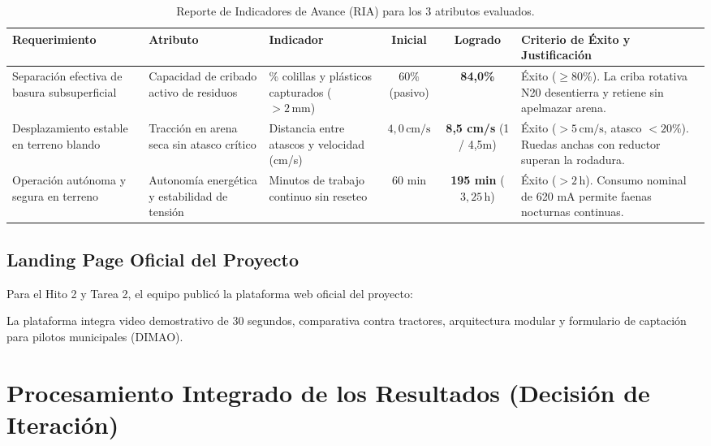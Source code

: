 \documentclass[12pt,letterpaper]{article}
\begin{document}
\begin{table}[h!]
\centering
\footnotesize
{}
\begin{tabularx}{\textwidth}{p{2.5cm} p{2.8cm} p{2.3cm} c c X}
\toprule
\textbf{Requerimiento} & \textbf{Atributo} & \textbf{Indicador} & \textbf{Inicial} & \textbf{Logrado} & \textbf{Criterio de Éxito y Justificación} \\
\midrule
Separación efectiva de basura subsuperficial & Capacidad de cribado activo de residuos & \% colillas y plásticos capturados ($>2\,\text{mm}$) & 60\% (pasivo) & \textbf{84,0\%} & Éxito ($\ge 80\%$). La criba rotativa N20 desentierra y retiene sin apelmazar arena. \\
\addlinespace
Desplazamiento estable en terreno blando & Tracción en arena seca sin atasco crítico & Distancia entre atascos y velocidad (cm/s) & $4,0\,\text{cm/s}$ & \textbf{8,5 cm/s} (1 / 4,5m) & Éxito ($>5\,\text{cm/s}$, atasco $<20\%$). Ruedas anchas con reductor superan la rodadura. \\
\addlinespace
Operación autónoma y segura en terreno & Autonomía energética y estabilidad de tensión & Minutos de trabajo continuo sin reseteo & 60 min & \textbf{195 min} ($3,25\,\text{h}$) & Éxito ($>2\,\text{h}$). Consumo nominal de 620 mA permite faenas nocturnas continuas. \\
\bottomrule
\end{tabularx}
\caption{Reporte de Indicadores de Avance (RIA) para los 3 atributos evaluados.}
\end{table}

\subsection{Landing Page Oficial del Proyecto}
Para el Hito 2 y Tarea 2, el equipo publicó la plataforma web oficial del proyecto:
\begin{center}
\end{center}
La plataforma integra video demostrativo de 30 segundos, comparativa contra tractores, arquitectura modular y formulario de captación para pilotos municipales (DIMAO).

\section{Procesamiento Integrado de los Resultados (Decisión de Iteración)}
\end{document}
